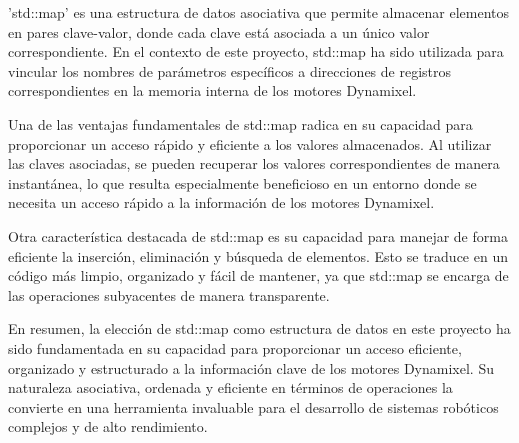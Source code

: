 \documentclass{article}
\begin{document}
    'std::map' es una estructura de datos asociativa que permite almacenar elementos en pares clave-valor, donde cada clave está asociada a un único valor correspondiente. En el contexto de este proyecto, std::map ha sido utilizada para vincular los nombres de parámetros específicos a direcciones de registros correspondientes en la memoria interna de los motores Dynamixel.

    Una de las ventajas fundamentales de std::map radica en su capacidad para proporcionar un acceso rápido y eficiente a los valores almacenados. Al utilizar las claves asociadas, se pueden recuperar los valores correspondientes de manera instantánea, lo que resulta especialmente beneficioso en un entorno donde se necesita un acceso rápido a la información de los motores Dynamixel.

    Otra característica destacada de std::map es su capacidad para manejar de forma eficiente la inserción, eliminación y búsqueda de elementos. Esto se traduce en un código más limpio, organizado y fácil de mantener, ya que std::map se encarga de las operaciones subyacentes de manera transparente.

    En resumen, la elección de std::map como estructura de datos en este proyecto ha sido fundamentada en su capacidad para proporcionar un acceso eficiente, organizado y estructurado a la información clave de los motores Dynamixel. Su naturaleza asociativa, ordenada y eficiente en términos de operaciones la convierte en una herramienta invaluable para el desarrollo de sistemas robóticos complejos y de alto rendimiento.
\end{document}
